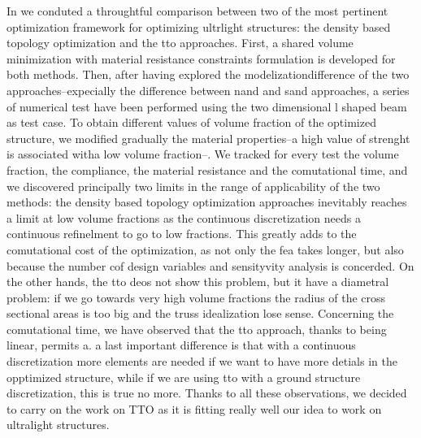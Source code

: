 In \chpref{} we conduted a throughtful comparison between two of the most pertinent optimization framework for optimizing ultrlight structures: the density based topology optimization and the \gls{tto} approaches. First, a shared volume minimization with material resistance constraints formulation is developed for both methods. Then, after having explored the modelizationdifference of the two approaches--expecially the difference between nand and sand approaches, a series of numerical test have been performed using the two dimensional l shaped beam as test case. To obtain different values of volume fraction of the optimized structure, we modified gradually the material properties--\ie a high value of strenght is associated witha low volume fraction--. We tracked for every test the volume fraction, the compliance, the material resistance and the comutational time, and we discovered principally two limits in the range of applicability of the two methods: the density based topology optimization approaches inevitably reaches a limit at low volume fractions as the continuous discretization needs a continuous refinelment to go to low fractions. This greatly adds to the comutational cost of the optimization, as not only the \gls{fea} takes longer, but also because the number cof design variables and sensityvity analysis is concerded. On the other hands, the \gls{tto} deos not show this problem, but it have a diametral problem: if we go towards very high volume fractions the radius of the cross sectional areas is too big and the truss idealization lose sense. Concerning the comutational time, we have observed that the tto approach, thanks to being linear, permits a. a last important difference is that with a continuous discretization more elements are needed if we want to have more detials in the opptimized structure, while if we are using tto with a ground structure discretization, this is true no more. Thanks to all these observations, we decided to carry on the work on TTO as it is fitting really well our idea to work on ultralight structures.

